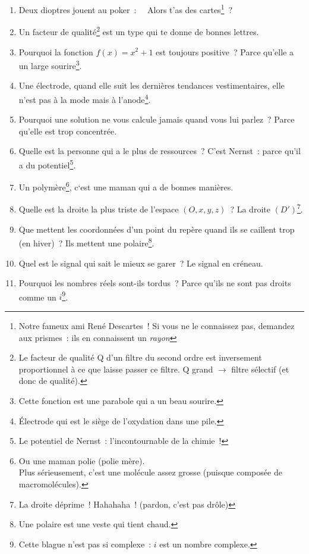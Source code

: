 \documentclass[10pt,a5paper,fullpage]{book}
\begin{document}
\begin{enumerate}
		\item Deux dioptres jouent au poker~: \guillemotleft~ Alors t’as des cartes\footnote{Notre fameux ami René Descartes~! Si vous ne le connaissez pas, demandez aux prismes~: ils en connaissent un \textit{rayon}}~?~\guillemotright
		\item Un facteur de qualité\footnote{Le facteur de qualité Q d’un filtre du second ordre est inversement proportionnel à ce que laisse passer ce filtre. Q grand $\rightarrow$ filtre sélectif (et donc de qualité).} est un type qui te donne de bonnes lettres.
		\item Pourquoi la fonction $f(x) = x^2 + 1$ est toujours positive~? Parce qu’elle a un large sourire\footnote{Cette fonction est une parabole qui a un beau sourire.}.
		\item Une électrode, quand elle suit les dernières tendances vestimentaires, elle n’est pas à la mode mais à l’anode\footnote{Électrode qui est le siège de l’oxydation dans une pile.}.
		\item Pourquoi une solution ne vous calcule jamais quand vous lui parlez~? Parce qu'elle est trop concentrée.
		\item Quelle est la personne qui a le plus de ressources~? C’est Nernst~: parce qu’il a du potentiel\footnote{Le potentiel de Nernst~: l’incontournable de la chimie~!}.
		\item Un polymère\footnote{Ou une maman polie (polie mère). \\Plus sérieusement, c’est une molécule assez grosse (puisque composée de macromolécules).}, c‘est une maman qui a de bonnes manières.
		\item Quelle est la droite la plus triste de l’espace ${(O,x,y,z)}$~? La droite $(D')$\footnote{La droite déprime~! Hahahaha~! \tiny{(pardon, c'est pas drôle)}}. 
		\item Que mettent les coordonnées d’un point du repère quand ils se caillent trop (en hiver)~? Ils mettent une polaire\footnote{Une polaire est une veste qui tient chaud.}.
		\item Quel est le signal qui sait le mieux se garer~? Le signal en créneau.
		\item Pourquoi les nombres réels sont-ils tordus~? Parce qu’ils ne sont pas droits comme un $i$\footnote{Cette blague n'est pas si complexe~: $i$ est un nombre complexe.}. \\

\end{enumerate}
\end{document}
